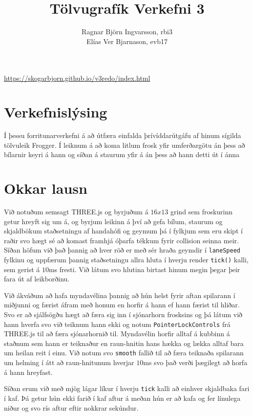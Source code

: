 \documentclass{article}
\title{Tölvugrafík Verkefni 3}
\author{Ragnar Björn Ingvarsson, rbi3 \\
Elías Ver Bjarnason, evb17}
\begin{document}
\renewcommand\thepage{}

	\maketitle
	\begin{center}\url{https://skogarbjorn.github.io/v3redo/index.html}\end{center}

	\newpage
	\setcounter{page}{1}
	\renewcommand\thepage{\arabic{page}}

	\section{Verkefnislýsing}
Í þessu forritunarverkefni á að útfæra einfalda
þrívíddarútgáfu af hinum sígilda tölvuleik Frogger. Í leiknum
á að koma litlum frosk yfir umferðargötu án þess að bílarnir
keyri á hann og síðan á staurum yfir á án þess að hann detti
út í ánna

\section{Okkar lausn}
Við notuðum semsagt THREE.js og byrjuðum á $16x13$ grind sem froskurinn getur hreyft sig um á, 
og byrjum leikinn á því að gefa bílum, staurum og skjaldbökum staðsetningu af handahófi 
og geymum þá í fylkjum sem eru skipt í raðir svo hægt sé að komast framhjá 
óþarfa tékkum fyrir collision seinna meir. Síðan höfum við það þannig að 
hver röð er með sér hraða geymdir í \texttt{laneSpeed} fylkinu og uppfærum 
þannig staðsetningu allra hluta í hverju render \texttt{tick()} kalli, sem 
gerist á $10$ms fresti. Við látum svo hlutina birtast hinum megin þegar þeir 
fara út af leikborðinu. 

Við ákváðum að hafa myndavélina þannig að hún helst fyrir aftan spilarann í miðjunni 
og færist áfram með honum en horfir á hann ef hann færist til hliðar. 
Svo er að sjálfsögðu hægt að færa sig inn í sjónarhorn frosksins og þá 
látum við hann hverfa svo við teiknum hann ekki og notum \texttt{PointerLockControls} frá THREE.js til að færa sjónarhornið til. 
Myndavélin horfir alltaf á kubbinn á staðnum sem hann er teiknaður en 
raun-hnitin hans hækka og lækka alltaf bara um heilan reit í einu. Við 
notum svo \texttt{smooth} fallið til að færa teiknaða spilarann um helming 
í átt að raun-hnitunum hverjar $10$ms svo það verði þægilegt að horfa á 
hann hreyfast.

Síðan erum við með mjög lágar líkur í hverju \texttt{tick} kalli að einhver 
skjaldbaka fari í kaf. Þá getur hún ekki farið í kaf aftur á meðan hún er 
að kafa og fer línulega niður og svo rís aftur eftir nokkrar sekúndur. 
\end{document}
